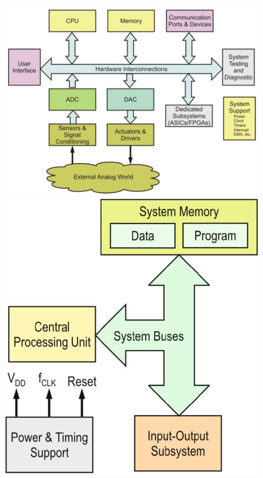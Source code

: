 \begin{minipage}{0.3\linewidth}
    \vspace{-2cm}
    \includegraphics[width=1.1\linewidth]{images/hardwareComponents}
    \includegraphics[width=0.8\linewidth]{images/uCArchitecture} 
\end{minipage}
\vspace{-0.5cm}
